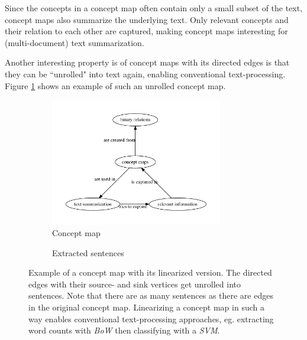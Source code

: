 Since the concepts in a concept map often contain only a small subset of the text, concept maps also summarize the underlying text.
Only relevant concepts and their relation to each other are captured, making concept maps interesting for (multi-document) text summarization.

Another interesting property is of concept maps with its directed edges is that they can be ``unrolled" into text again, enabling conventional text-processing.
Figure \ref{fig:concept_map_linearization} shows an example of such an unrolled concept map.

\begin{figure}[htb!]
	\centering
	\begin{subfigure}[b]{.48\linewidth}
		\centering
		\includegraphics[height=2.2in]{assets/figures/graph_example_linearization.pdf}
		\caption{Concept map}
	\end{subfigure}
	\begin{subfigure}[b]{.48\linewidth}
		\centering
		\noindent{}
		\vspace{0.7in}
		\caption{Extracted sentences}
	\end{subfigure}%
	\caption[Example: Linearized Concept Map]{Example of a concept map with its linearized version.
		The directed edges with their source- and sink vertices get unrolled into sentences.
		Note that there are as many sentences as there are edges in the original concept map.
		Linearizing a concept map in such a way enables conventional text-processing approaches, eg. extracting word counts with \textit{BoW} then classifying with a \textit{SVM}.}
	\label{fig:concept_map_linearization}
\end{figure}

